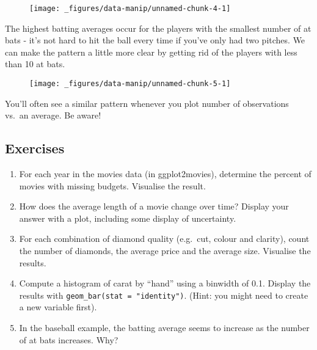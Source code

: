 \begin{figure}[H]
  \centering
  \texttt{[image: \_figures/data-manip/unnamed-chunk-4-1]}
\end{figure}

The highest batting averages occur for the players with the smallest
number of at bats - it's not hard to hit the ball every time if you've
only had two pitches. We can make the pattern a little more clear by
getting rid of the players with less than 10 at bats.

\begin{Shaded}
\begin{Highlighting}[]
\NormalTok{(}\StringTok{ }\NormalTok{), }\StringTok{ }
\StringTok{  }\NormalTok{() +}\StringTok{ }
\StringTok{  }\NormalTok{()}
\end{Highlighting}
\end{Shaded}

\begin{figure}[H]
  \centering
  \texttt{[image: \_figures/data-manip/unnamed-chunk-5-1]}
\end{figure}

You'll often see a similar pattern whenever you plot number of
observations vs.~an average. Be aware!

\subsection{Exercises}

\begin{enumerate}
\def\labelenumi{\arabic{enumi}.}
\item
  For each year in the movies data (in ggplot2movies), determine the
  percent of movies with missing budgets. Visualise the result.
\item
  How does the average length of a movie change over time? Display your
  answer with a plot, including some display of uncertainty.
\item
  For each combination of diamond quality (e.g.~cut, colour and
  clarity), count the number of diamonds, the average price and the
  average size. Visualise the results.
\item
  Compute a histogram of carat by ``hand'' using a binwidth of 0.1.
  Display the results with \texttt{geom\_bar(stat\ =\ "identity")}.
  (Hint: you might need to create a new variable first).
\item
  In the baseball example, the batting average seems to increase as the
  number of at bats increases. Why?
\end{enumerate}

